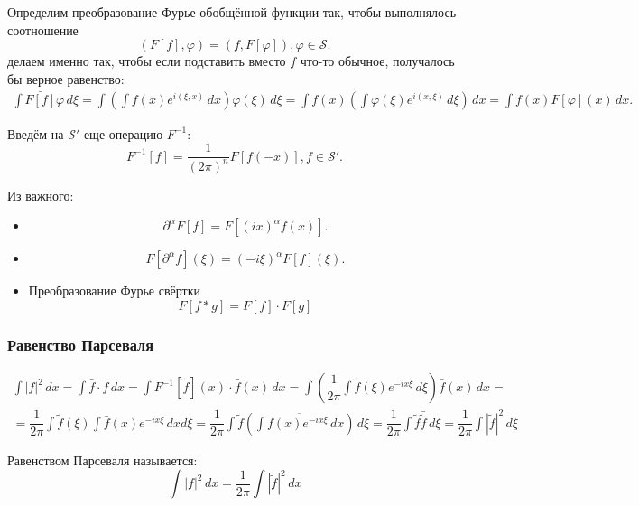 Определим преобразование Фурье обобщённой функции так, чтобы выполнялось соотношение
\[
  (F[f], \varphi) = (f, F[\varphi]), \varphi \in \mathcal{S}.
\]
делаем именно так, чтобы если подставить вместо $f$ что-то обычное, получалось бы верное равенство:
\begin{multline*}
  \int \bar{F[f]} \varphi \, d\xi
  = \int \left( \int f(x) e^{i (\xi, x)} \, dx \right) \varphi(\xi) \, d\xi
  = \int f(x) \left( \int \varphi(\xi) e^{i (x, \xi)} \, d\xi \right) \, dx
  = \int f(x) F[\varphi](x) \, dx.
\end{multline*}

Введём на $\mathcal{S}'$ еще операцию $F^{-1}$:
\[
  F^{-1}[f] = \dfrac{1}{(2\pi)^n} F[f(-x)], f\in \mathcal{S}'.
\]

Из важного:
\begin{itemize}
  \item 
    \[
      \partial^\alpha F[f] = F \left[ (ix)^\alpha f(x) \right].
    \]
  \item
    \[
      F \left[ \partial^\alpha f \right] (\xi) = (-i\xi)^\alpha F[f] (\xi).
    \]
  \item Преобразование Фурье свёртки
    \[
      F \left[ f * g \right] = F[f] \cdot F[g]
    \]
\end{itemize}

\subsubsection{Равенство Парсеваля}


\begin{multline*}
  \int |f|^2 \, dx = \int \bar f \cdot f \, dx
  = \int F^{-1} [\tilde f] (x) \cdot \bar f(x) \, dx
  = \int \left( \dfrac{1}{2\pi} \int \tilde f(\xi) e^{-ix\xi} \, d\xi\right) \bar f(x) \, dx = \\
  = \dfrac{1}{2\pi} \int \tilde f(\xi) \int \bar f(x) e^{- i x \xi} \, dx d\xi
  = \dfrac{1}{2\pi} \int \tilde f \left( \overline{\int f(x) e^{- i x \xi} \, dx} \right) \, d\xi
  = \dfrac{1}{2\pi} \int \tilde f \bar{\tilde f} \, d\xi
  = \dfrac{1}{2\pi} \int |\tilde f|^2 \, d\xi
\end{multline*}

Равенством Парсеваля называется:
\[
  \int |f|^2 \, dx = \dfrac{1}{2\pi} \int |\tilde f|^2 \, dx
\]
